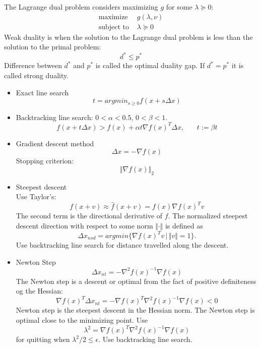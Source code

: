 \documentclass[12pt,a4paper]{report}
\begin{document}
The Lagrange dual problem considers maximizing $g$ for some $\lambda \succeq 0$:
\begin{align*}
\text{maximize }&g(\lambda,\nu)\\
\text{subject to }&\lambda\succeq0
\end{align*}
Weak duality is when the solution to the Lagrange dual problem is less than the solution to the primal problem:
\begin{equation}
d^*\leq p^*
\end{equation}
Difference between $d^*$ and $p^*$ is called the optimal duality gap. If $d^*=p^*$ it is called strong duality.
\begin{itemize}
\item Exact line search
\begin{equation}
t=argmin_{s\geq0} f(x+s\Delta x)
\end{equation}
\item Backtracking line search: $0<\alpha<0.5$, $0<\beta<1$.
\begin{equation}
f(x+t\Delta x)>f(x)+\alpha t\nabla f(x)^T\Delta x,\phantom{mm}t:=\beta t
\end{equation}
\item Gradient descent method
\begin{equation}
\Delta x = -\nabla f(x)
\end{equation}
Stopping criterion:
\begin{equation}
\Vert \nabla f(x)\Vert_2
\end{equation}
\item Steepest descent\\
Use Taylor's:
\begin{equation}
f(x+v)\approx \hat{f}(x+v)=f(x)\nabla f(x)^Tv
\end{equation}
The second term is the directional derivative of $f$. The normalized steepest descent direction with respect to some norm $\Vert\cdot\Vert$ is defined as
\begin{equation}
\Delta x_{nsd}=argmin\{\nabla f(x)^Tv\,|\,\Vert v\Vert=1\}.
\end{equation}
Use backtracking line search for distance travelled along the descent.
\item Newton Step
\begin{equation}
\Delta x_{nt}=-\nabla^2f(x)^{-1}\nabla f(x)
\end{equation}
The Newton step is a descent or optimal from the fact of positive definiteness og the Hessian:
\begin{equation}
\nabla f(x)^T\Delta x_{nt}=-\nabla f(x)^T\nabla^2f(x)^{-1}\nabla f(x)<0
\end{equation}
Newton step is the steepest descent in the Hessian norm. The Newton step is optimal close to the minimizing point. Use
\begin{equation}
\lambda^2=\nabla f(x)^T\nabla^2f(x)^{-1}\nabla f(x)
\end{equation}
for quitting when $\lambda^2/2\leq\epsilon$. Use backtracking line search.
\end{itemize}
\end{document}
